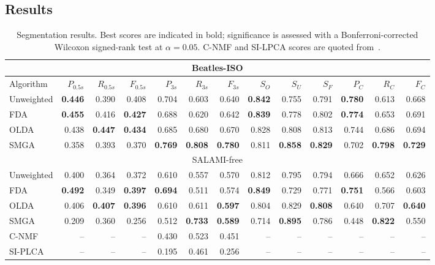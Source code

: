 \documentclass{article}
\begin{document}
\subsection{Results}
\label{sec:results}
\begin{table}
\centering
\caption{Segmentation results. Best scores are indicated in bold; significance is assessed with a Bonferroni-corrected Wilcoxon
signed-rank test at $\alpha=0.05$. C-NMF and SI-LPCA scores are quoted from~\cite{nieto2013convex}.\label{tab:results}}
\footnotesize
\begin{tabular}{lrrrrrrrrrrrr}
\multicolumn{13}{c}{Beatles-ISO}\\
\toprule%
Algorithm   &   $P_{0.5s}$ & $R_{0.5s}$ & $F_{0.5s}$ & $P_{3s}$     & $R_{3s}$  & $F_{3s}$   & $S_O$ & $S_U$ & $S_F$ & $P_C$& $R_C$& $F_C$\\
\hline
Unweighted  &   \textbf{0.446} & 0.390 & 0.408 & 0.704   & 0.603 & 0.640 & \textbf{0.842} & 0.755 & 0.791 & \textbf{0.780} & 0.613 & 0.668\\
FDA         &   \textbf{0.455} & 0.416 & \textbf{0.427} & 0.688 & 0.620 & 0.642 & \textbf{0.839} & 0.778 & 0.802 & \textbf{0.774} & 0.653 & 0.691\\
OLDA        &   0.438 & \textbf{0.447} & \textbf{0.434} & 0.685   & 0.680 & 0.670 & 0.828 & 0.808 & 0.813 & 0.744 & 0.686 & 0.694\\
\hline
SMGA~\hfill\cite{serra2012unsupervised}
            &   0.358 & 0.393 & 0.370 & \textbf{0.769}   & \textbf{0.808} & \textbf{0.780} & 0.811 & \textbf{0.858} & \textbf{0.829} & 0.702 & \textbf{0.798} &
            \textbf{0.729}\\
\toprule%
\multicolumn{13}{c}{SALAMI-free}\\
\toprule%
Unweighted  & 0.400 & 0.364 & 0.372 & 0.610 & 0.557 & 0.570 & 0.812 & 0.795 & 0.794 & 0.666 & 0.652 & 0.626\\
FDA     &  \textbf{0.492} & 0.349 & \textbf{0.397} & \textbf{0.694} & 0.511 & 0.574 & \textbf{0.849} & 0.729 & 0.771 &
\textbf{0.751} & 0.566 & 0.603\\
OLDA    &  0.406 & \textbf{0.407} & \textbf{0.396} & 0.610 & 0.611 & \textbf{0.597} & 0.804 & 0.829 & \textbf{0.808} & 0.640 & 0.707 & \textbf{0.640}\\
\hline
SMGA~\hfill\cite{serra2012unsupervised}
        & 0.209 & 0.360 & 0.256 & 0.512 & \textbf{0.733} & \textbf{0.589} & 0.714 & \textbf{0.895} & 0.786 & 0.448 & \textbf{0.822} & 0.550\\
C-NMF~\hfill\cite{nieto2013convex}            
        & -- & -- & -- & 0.430 & 0.523 & 0.451 & -- & -- & -- & -- & -- & -- \\
SI-PLCA~\hfill\cite{weiss2011unsupervised}    
        & -- & -- & -- & 0.195 & 0.461 & 0.256 & -- & -- & -- & -- & -- & -- \\  
\bottomrule%
\end{tabular}
\end{table}
\end{document}
